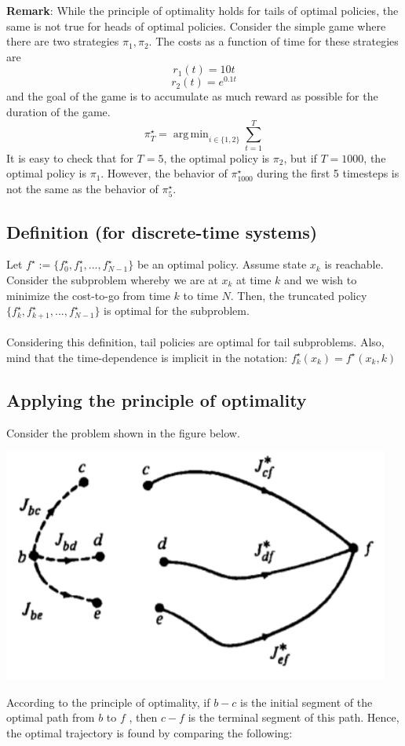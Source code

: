\documentclass[twoside]{article}
\DeclareMathOperator*{\argmin}{arg\,min}
\begin{document}
\textbf{Remark}: While the principle of optimality holds for tails of optimal policies, the same is not true for heads of optimal policies. Consider the simple game where there are two strategies $\pi_1, \pi_2$. The costs as a function of time for these strategies are
$$r_1(t)=10t $$
$$r_2(t)=e^{0.1t} $$
and the goal of the game is to accumulate as much reward as possible for the duration of the game.
$$\pi^\star_T=\argmin_{i\in\{1,2\}}\sum_{t=1}^{T}$$
It is easy to check that for $T=5$, the optimal policy is $\pi_2$, but if $T=1000$, the optimal policy is $\pi_1$. However, the behavior of $\pi^{\star}_{1000}$ during the first 5 timesteps is not the same as the behavior of $\pi^{\star}_5$.
\\ \subsection{Definition (for discrete-time systems)}
Let $f^\star := \{f_0^\star,f_1^\star, . . . , f_{N−1}^\star \}$ be an optimal policy. Assume state $x_k$ is reachable. Consider the subproblem whereby we are at $x_k$ at time $k$ and we wish to minimize the cost-to-go from time $k$ to time $N$. Then, the truncated policy $\{f_k^\star,f_{k+1}^\star, . . . , f_{N−1}^\star \}$ is optimal for the subproblem.
\\
\\
Considering this definition, tail policies are optimal for tail subproblems. Also, mind that the time-dependence is implicit in the notation: $f_k^\star(x_k)=f^\star(x_k,k)$
\\ \subsection{Applying the principle of optimality}
Consider the problem shown in the figure below.
\begin{center}
\includegraphics[width=0.5 \textwidth]{image3.png}
\end{center}
According to the principle of optimality, if $b-c$ is the initial segment of the optimal path from $b$ to $f$ , then $c-f$ is the terminal segment of this path. Hence, the optimal trajectory is found by comparing the following:
\end{document}
